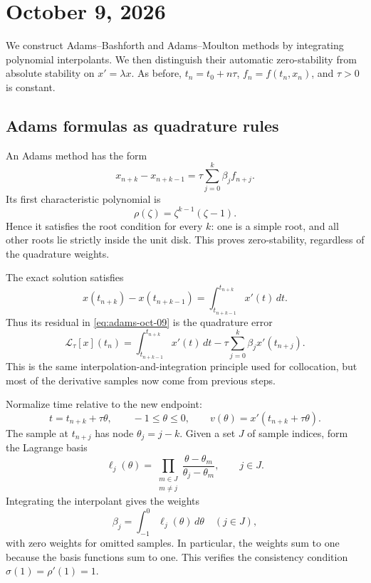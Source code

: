\section{October 9, 2026}

We construct Adams--Bashforth and Adams--Moulton methods by integrating
polynomial interpolants. We then distinguish their automatic
zero-stability from absolute stability on \(x'=\lambda x\).
As before, \(t_n=t_0+n\tau\), \(f_n=f(t_n,x_n)\), and \(\tau>0\)
is constant.

\subsection{Adams formulas as quadrature rules}

An Adams method has the form
\begin{equation}\label{eq:adams-oct-09}
 x_{n+k}-x_{n+k-1}=\tau\sum_{j=0}^k\beta_jf_{n+j}.
\end{equation}
Its first characteristic polynomial is
\[
 \rho(\zeta)=\zeta^{k-1}(\zeta-1).
\]
Hence it satisfies the root condition for every \(k\): one is a
simple root, and all other roots lie strictly inside the unit disk.
This proves zero-stability, regardless of the quadrature weights.

The exact solution satisfies
\[
 x(t_{n+k})-x(t_{n+k-1})
      =\int_{t_{n+k-1}}^{t_{n+k}}x'(t)\,dt.
\]
Thus its residual in \eqref{eq:adams-oct-09} is the quadrature error
\begin{equation}\label{eq:adams-quadrature-error-oct-09}
 \mathcal L_\tau[x](t_n)
  =\int_{t_{n+k-1}}^{t_{n+k}}x'(t)\,dt
       -\tau\sum_{j=0}^k\beta_jx'(t_{n+j}).
\end{equation}
This is the same interpolation-and-integration principle used for
collocation, but most of the derivative samples now come from
previous steps.

Normalize time relative to the new endpoint:
\[
 t=t_{n+k}+\tau\theta,\qquad -1\leq\theta\leq0,
 \qquad v(\theta)=x'(t_{n+k}+\tau\theta).
\]
The sample at \(t_{n+j}\) has node \(\theta_j=j-k\).
Given a set \(J\) of sample indices, form the Lagrange basis
\[
 \ell_j(\theta)
   =\prod_{\substack{m\in J\\m\neq j}}
        \frac{\theta-\theta_m}{\theta_j-\theta_m},
 \qquad j\in J.
\]
Integrating the interpolant gives the weights
\begin{equation}\label{eq:adams-weights-oct-09}
 \boxed{\beta_j=\int_{-1}^0\ell_j(\theta)\,d\theta
           \quad(j\in J),}
\end{equation}
with zero weights for omitted samples. In particular, the weights
sum to one because the basis functions sum to one. This verifies
the consistency condition \(\sigma(1)=\rho'(1)=1\).

